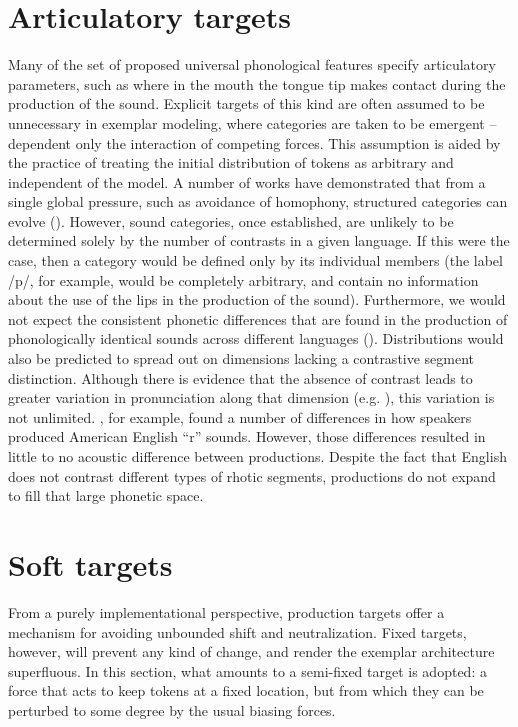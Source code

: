 \section{Articulatory targets}

Many of the set of proposed universal phonological features specify
articulatory parameters, such as where in the mouth the tongue tip
makes contact during the production of the sound. Explicit targets
of this kind are often assumed to be unnecessary in exemplar modeling,
where categories are taken to be emergent – dependent only the interaction
of competing forces. This assumption is aided by the practice of treating
the initial distribution of tokens as arbitrary and independent of
the model. A number of works have demonstrated that from a single
global pressure, such as avoidance of homophony, structured categories
can evolve (\citealt{Boer2000,Wedel2006,soskuthy2013phonetic}). However,
sound categories, once established, are unlikely to be determined
solely by the number of contrasts in a given language. If this were
the case, then a category would be defined only by its individual
members (the label {/p/}, for example, would be completely
arbitrary, and contain no information about the use of the lips in
the production of the sound). Furthermore, we would not expect the
consistent phonetic differences that are found in the production of
phonologically identical sounds across different languages (\citealt{Keating1985}).
Distributions would also be predicted to spread out on dimensions
lacking a contrastive segment distinction. Although there is evidence
that the absence of contrast leads to greater variation in pronunciation
along that dimension (e.g. \citealt{choi1995acoustic}), this variation
is not unlimited. \citet{Baker2011}, for example, found a number
of differences in how speakers produced American English “r”
sounds. However, those differences resulted in little to no acoustic
difference between productions. Despite the fact that English does
not contrast different types of rhotic segments, productions do not
expand to fill that large phonetic space. 

\section{\label{subsec:Soft-Targets}Soft targets}

From a purely implementational perspective, production targets offer
a mechanism for avoiding unbounded shift and neutralization. Fixed
targets, however, will prevent any kind of change, and render the
exemplar architecture superfluous. In this section, what amounts to
a semi-fixed target is adopted: a force that acts to keep tokens at
a fixed location, but from which they can be perturbed to some degree
by the usual biasing forces. 

